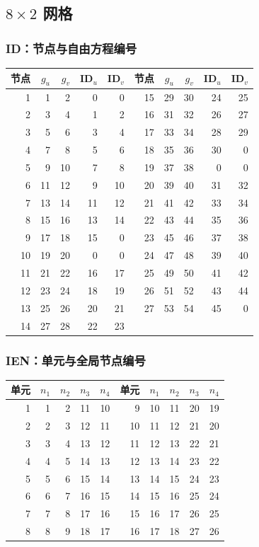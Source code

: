 \subsection{$8\times2$ 网格}
\subsubsection*{ID：节点与自由方程编号}
\small\begin{longtable}{rrrrr@{\qquad}rrrrr}
\toprule 节点 & $g_u$ & $g_v$ & ID$_u$ & ID$_v$ & 节点 & $g_u$ & $g_v$ & ID$_u$ & ID$_v$ \\ \midrule\endhead
1 & 1 & 2 & 0 & 0 & 15 & 29 & 30 & 24 & 25 \\
2 & 3 & 4 & 1 & 2 & 16 & 31 & 32 & 26 & 27 \\
3 & 5 & 6 & 3 & 4 & 17 & 33 & 34 & 28 & 29 \\
4 & 7 & 8 & 5 & 6 & 18 & 35 & 36 & 30 & 0 \\
5 & 9 & 10 & 7 & 8 & 19 & 37 & 38 & 0 & 0 \\
6 & 11 & 12 & 9 & 10 & 20 & 39 & 40 & 31 & 32 \\
7 & 13 & 14 & 11 & 12 & 21 & 41 & 42 & 33 & 34 \\
8 & 15 & 16 & 13 & 14 & 22 & 43 & 44 & 35 & 36 \\
9 & 17 & 18 & 15 & 0 & 23 & 45 & 46 & 37 & 38 \\
10 & 19 & 20 & 0 & 0 & 24 & 47 & 48 & 39 & 40 \\
11 & 21 & 22 & 16 & 17 & 25 & 49 & 50 & 41 & 42 \\
12 & 23 & 24 & 18 & 19 & 26 & 51 & 52 & 43 & 44 \\
13 & 25 & 26 & 20 & 21 & 27 & 53 & 54 & 45 & 0 \\
14 & 27 & 28 & 22 & 23 &  &  &  &  &  \\
\bottomrule\end{longtable}\normalsize
\subsubsection*{IEN：单元与全局节点编号}
\small\begin{longtable}{rrrrr@{\qquad}rrrrr}
\toprule 单元 & $n_1$ & $n_2$ & $n_3$ & $n_4$ & 单元 & $n_1$ & $n_2$ & $n_3$ & $n_4$ \\ \midrule\endhead
1 & 1 & 2 & 11 & 10 & 9 & 10 & 11 & 20 & 19 \\
2 & 2 & 3 & 12 & 11 & 10 & 11 & 12 & 21 & 20 \\
3 & 3 & 4 & 13 & 12 & 11 & 12 & 13 & 22 & 21 \\
4 & 4 & 5 & 14 & 13 & 12 & 13 & 14 & 23 & 22 \\
5 & 5 & 6 & 15 & 14 & 13 & 14 & 15 & 24 & 23 \\
6 & 6 & 7 & 16 & 15 & 14 & 15 & 16 & 25 & 24 \\
7 & 7 & 8 & 17 & 16 & 15 & 16 & 17 & 26 & 25 \\
8 & 8 & 9 & 18 & 17 & 16 & 17 & 18 & 27 & 26 \\
\bottomrule\end{longtable}\normalsize